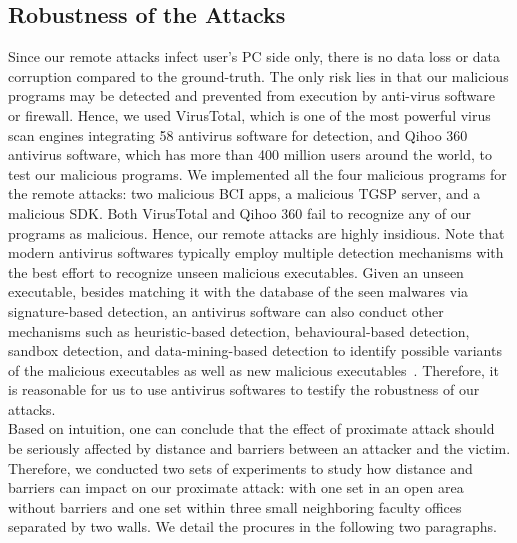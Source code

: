 \subsection{Robustness of the Attacks}
Since our remote attacks infect user's PC side only, there is no data loss or data corruption compared to the ground-truth. The only risk lies in that our malicious programs may be detected and prevented from execution by anti-virus software or firewall. Hence, we used VirusTotal, which is one of the most powerful virus scan engines integrating 58 antivirus software for detection, and Qihoo 360 antivirus software, which has more than 400 million users around the world, to test our malicious programs. We implemented all the four malicious programs for the remote attacks: two malicious BCI apps, a malicious TGSP server, and a malicious SDK. Both VirusTotal and Qihoo 360 fail to recognize any of our programs as malicious. Hence, our remote attacks are highly insidious. Note that modern antivirus softwares typically employ multiple detection mechanisms with the best effort to recognize unseen malicious executables. Given an unseen executable, besides matching it with the database of the seen malwares via signature-based detection, an antivirus software can also conduct other mechanisms such as heuristic-based detection, behavioural-based detection, sandbox detection, and data-mining-based detection to identify possible variants of the malicious executables as well as new malicious executables~\cite{antivirusintro}. Therefore, it is reasonable for us to use antivirus softwares to testify the robustness of our attacks.\\
%
\indent Based on intuition, one can conclude that the effect of proximate attack should be seriously affected by distance and barriers between an attacker and the victim. Therefore, we conducted two sets of experiments to study how distance and barriers can impact on our proximate attack: with one set in an open area without barriers and one set within three small neighboring faculty offices separated by two walls. We detail the procures in the following two paragraphs.\\
%
\indent
